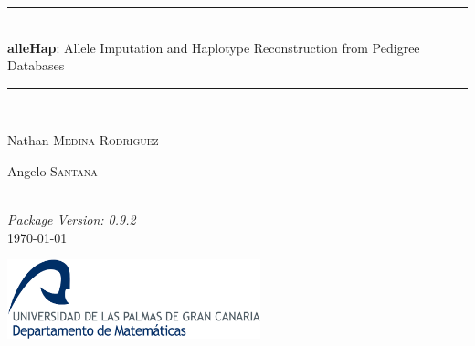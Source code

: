 \begin{titlepage}

\newcommand{\HRule}{\rule{\linewidth}{0.5mm}}

\begin{center}


\HRule \\[1cm]

\LARGE \textbf{alleHap}: Allele Imputation and Haplotype Reconstruction from Pedigree Databases
\\[0.65cm]

\HRule \\[1cm]


\begin{minipage}{0.5\textwidth}
\begin{flushleft} \large
Nathan \textsc{Medina-Rodriguez}
\end{flushleft}
\end{minipage}%
\begin{minipage}{0.4\textwidth}
\begin{flushright} \large
Angelo \textsc{Santana}
\end{flushright}
\end{minipage}\\[1.5cm]


\large \emph{Package Version: 0.9.2}\\[1.2cm]
\small \today

\vfill

\includegraphics[width=0.55\textwidth]{./logo}~\\

\end{center}

\end{titlepage}

